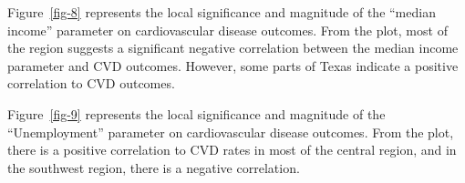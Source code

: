 \documentclass[
]{article}
\begin{document}
Figure~\ref{fig-8} represents the local significance and magnitude of
the ``median income'' parameter on cardiovascular disease outcomes. From
the plot, most of the region suggests a significant negative correlation
between the median income parameter and CVD outcomes. However, some
parts of Texas indicate a positive correlation to CVD outcomes.~

Figure~\ref{fig-9} represents the local significance and magnitude of
the ``Unemployment'' parameter on cardiovascular disease outcomes. From
the plot, there is a positive correlation to CVD rates in most of the
central region, and in the southwest region, there is a negative
correlation.

\begin{figure}

\begin{minipage}{0.50\linewidth}



\end{minipage}%
%
\begin{minipage}{0.50\linewidth}

\end{minipage}
\end{figure}
\end{document}
